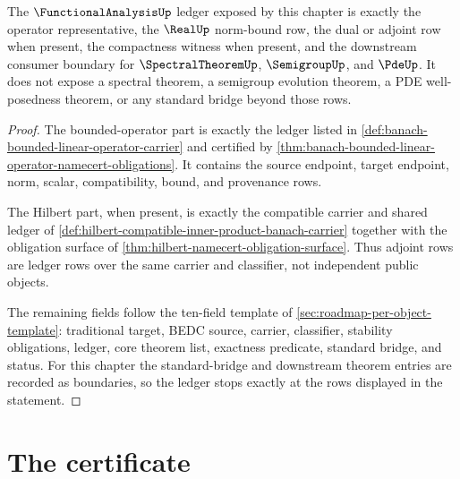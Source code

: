 \begin{theorem}
\label{thm:functionalanalysis-exact-ledger-boundary-obligation}
The $\FunctionalAnalysisUp$ ledger exposed by this chapter is exactly the
operator representative, the $\RealUp$ norm-bound row, the dual or adjoint row
when present, the compactness witness when present, and the downstream
consumer boundary for $\SpectralTheoremUp$, $\SemigroupUp$, and $\PdeUp$. It
does not expose a spectral theorem, a semigroup evolution theorem, a PDE
well-posedness theorem, or any standard bridge beyond those rows.
\end{theorem}
\begin{proof}
The bounded-operator part is exactly the ledger listed in
\autoref{def:banach-bounded-linear-operator-carrier} and certified by
\autoref{thm:banach-bounded-linear-operator-namecert-obligations}. It contains
the source endpoint, target endpoint, norm, scalar, compatibility, bound, and
provenance rows.

The Hilbert part, when present, is exactly the compatible carrier and shared
ledger of \autoref{def:hilbert-compatible-inner-product-banach-carrier}
together with the obligation surface of
\autoref{thm:hilbert-namecert-obligation-surface}. Thus adjoint rows are
ledger rows over the same carrier and classifier, not independent public
objects.

The remaining fields follow the ten-field template of
\autoref{sec:roadmap-per-object-template}: traditional target, BEDC source,
carrier, classifier, stability obligations, ledger, core theorem list,
exactness predicate, standard bridge, and status. For this chapter the
standard-bridge and downstream theorem entries are recorded as boundaries, so
the ledger stops exactly at the rows displayed in the statement.
\end{proof}

\section{The certificate}
\label{sec:functionalanalysis-certificate}

